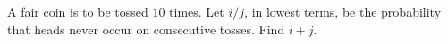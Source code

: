 A fair coin is to be tossed $10$ times. Let $i/j$, in lowest terms, be the probability that heads never occur on consecutive tosses. Find $i+j$.
